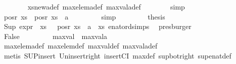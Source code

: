 \begin{isabellebody}
\ \ \ \ \ \ \isamarkupfalse%
\ xs{\isacharunderscore}{\kern0pt}new{\isacharunderscore}{\kern0pt}a{\isacharunderscore}{\kern0pt}def\ max{\isacharunderscore}{\kern0pt}elem{\isacharunderscore}{\kern0pt}a{\isacharunderscore}{\kern0pt}def\ max{\isacharunderscore}{\kern0pt}val{\isacharunderscore}{\kern0pt}a{\isacharunderscore}{\kern0pt}def\isanewline
\ \ \ \ \ \ \isamarkupfalse%
\ simp\isanewline
\ \ \ \ \isamarkupfalse%
\ {\isachardoublequoteopen}pos{\isacharunderscore}{\kern0pt}r\ xs\ {\isasymsubseteq}\ pos{\isacharunderscore}{\kern0pt}r\ {\isacharparenleft}{\kern0pt}xs\ {\isasymunion}\ {\isacharbraceleft}{\kern0pt}a{\isacharbraceright}{\kern0pt}{\isacharparenright}{\kern0pt}{\isachardoublequoteclose}\ \isanewline
\ \ \ \ \ \ \isamarkupfalse%
\ simp\ \isanewline
\ \ \ \ \isamarkupfalse%
\ \isamarkupfalse%
\ {\isacharquery}{\kern0pt}thesis\ \isanewline
\ \ \ \ \ \ \isamarkupfalse%
\ {\isacartoucheopen}Sup\ {\isacharparenleft}{\kern0pt}expr{\isacharunderscore}{\kern0pt}{}\ {\isacharbackquote}{\kern0pt}\ xs{\isacharparenright}{\kern0pt}\ {\isacharequal}{\kern0pt}\ {\isasyminfinity}{\isacartoucheclose}\ {\isacartoucheopen}pos{\isacharunderscore}{\kern0pt}r\ {\isacharparenleft}{\kern0pt}xs\ {\isasymunion}\ {\isacharbraceleft}{\kern0pt}a{\isacharbraceright}{\kern0pt}{\isacharparenright}{\kern0pt}\ {\isacharequal}{\kern0pt}\ xs{\isacartoucheclose}\ enat{\isacharunderscore}{\kern0pt}ord{\isacharunderscore}{\kern0pt}simps{\isacharparenleft}{\kern0pt}{}{\isacharparenright}{\kern0pt}\ \isamarkupfalse%
\ presburger\isanewline
\ \ \isamarkupfalse%
\isanewline
\ \ \ \ \isamarkupfalse%
\ {}\isanewline
\ \ \ \ \isamarkupfalse%
\ False\ \isanewline
\ \ \ \ \ \ \isamarkupfalse%
\ {\isacartoucheopen}max{\isacharunderscore}{\kern0pt}val\ {\isasymle}\ max{\isacharunderscore}{\kern0pt}val{\isacharunderscore}{\kern0pt}a{\isacartoucheclose}\isanewline
\ \ \ \ \ \ \isamarkupfalse%
\ max{\isacharunderscore}{\kern0pt}elem{\isacharunderscore}{\kern0pt}a{\isacharunderscore}{\kern0pt}def\ max{\isacharunderscore}{\kern0pt}elem{\isacharunderscore}{\kern0pt}def\ max{\isacharunderscore}{\kern0pt}val{\isacharunderscore}{\kern0pt}def\ max{\isacharunderscore}{\kern0pt}val{\isacharunderscore}{\kern0pt}a{\isacharunderscore}{\kern0pt}def\isanewline
\ \ \ \ \ \ \isamarkupfalse%
\ {\isacharparenleft}{\kern0pt}metis\ SUP{\isacharunderscore}{\kern0pt}insert\ Un{\isacharunderscore}{\kern0pt}insert{\isacharunderscore}{\kern0pt}right\ insertCI\ max{\isacharunderscore}{\kern0pt}def\ sup{\isacharunderscore}{\kern0pt}bot{\isacharunderscore}{\kern0pt}right\ sup{\isacharunderscore}{\kern0pt}enat{\isacharunderscore}{\kern0pt}def{\isacharparenright}{\kern0pt}\isanewline

\end{isabellebody}
